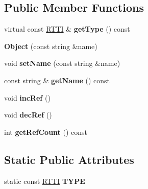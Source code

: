\subsection*{Public Member Functions}
\begin{DoxyCompactItemize}
\item 
\hypertarget{class_object_aced0a1a622fb0155b74f6e2e1058b2c2}{
virtual const \hyperlink{class_r_t_t_i}{RTTI} \& {\bfseries getType} () const }
\label{class_object_aced0a1a622fb0155b74f6e2e1058b2c2}

\item 
\hypertarget{class_object_ab38070a3be64ec57740528011a10d542}{
{\bfseries Object} (const string \&name)}
\label{class_object_ab38070a3be64ec57740528011a10d542}

\item 
\hypertarget{class_object_a6b8fc39c7613b32e5e25e549aaf293ad}{
void {\bfseries setName} (const string \&name)}
\label{class_object_a6b8fc39c7613b32e5e25e549aaf293ad}

\item 
\hypertarget{class_object_a40651ab63aba5bfb7ddc6f495d5d4b60}{
const string \& {\bfseries getName} () const }
\label{class_object_a40651ab63aba5bfb7ddc6f495d5d4b60}

\item 
\hypertarget{class_object_a870ac8cc97fa1d18b1a503c9a9245895}{
void {\bfseries incRef} ()}
\label{class_object_a870ac8cc97fa1d18b1a503c9a9245895}

\item 
\hypertarget{class_object_a164b1855548a10e8881f3bef5ad9d917}{
void {\bfseries decRef} ()}
\label{class_object_a164b1855548a10e8881f3bef5ad9d917}

\item 
\hypertarget{class_object_ad5037099674461f49304cfe2d26ef317}{
int {\bfseries getRefCount} () const }
\label{class_object_ad5037099674461f49304cfe2d26ef317}

\end{DoxyCompactItemize}
\subsection*{Static Public Attributes}
\begin{DoxyCompactItemize}
\item 
\hypertarget{class_object_a5e2bc03cb3fa6122b28fff1b0049a30e}{
static const \hyperlink{class_r_t_t_i}{RTTI} {\bfseries TYPE}}
\label{class_object_a5e2bc03cb3fa6122b28fff1b0049a30e}

\end{DoxyCompactItemize}

